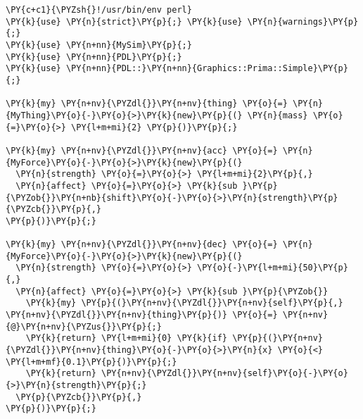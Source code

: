 \begin{Verbatim}[commandchars=\\\{\}]
\PY{c+c1}{\PYZsh{}!/usr/bin/env perl}
\PY{k}{use} \PY{n}{strict}\PY{p}{;} \PY{k}{use} \PY{n}{warnings}\PY{p}{;}
\PY{k}{use} \PY{n+nn}{MySim}\PY{p}{;}
\PY{k}{use} \PY{n+nn}{PDL}\PY{p}{;}
\PY{k}{use} \PY{n+nn}{PDL::}\PY{n+nn}{Graphics::Prima::Simple}\PY{p}{;}

\PY{k}{my} \PY{n+nv}{\PYZdl{}}\PY{n+nv}{thing} \PY{o}{=} \PY{n}{MyThing}\PY{o}{-}\PY{o}{>}\PY{k}{new}\PY{p}{(} \PY{n}{mass} \PY{o}{=}\PY{o}{>} \PY{l+m+mi}{2} \PY{p}{)}\PY{p}{;}

\PY{k}{my} \PY{n+nv}{\PYZdl{}}\PY{n+nv}{acc} \PY{o}{=} \PY{n}{MyForce}\PY{o}{-}\PY{o}{>}\PY{k}{new}\PY{p}{(}
  \PY{n}{strength} \PY{o}{=}\PY{o}{>} \PY{l+m+mi}{2}\PY{p}{,}
  \PY{n}{affect} \PY{o}{=}\PY{o}{>} \PY{k}{sub }\PY{p}{\PYZob{}}\PY{n+nb}{shift}\PY{o}{-}\PY{o}{>}\PY{n}{strength}\PY{p}{\PYZcb{}}\PY{p}{,}
\PY{p}{)}\PY{p}{;}

\PY{k}{my} \PY{n+nv}{\PYZdl{}}\PY{n+nv}{dec} \PY{o}{=} \PY{n}{MyForce}\PY{o}{-}\PY{o}{>}\PY{k}{new}\PY{p}{(}
  \PY{n}{strength} \PY{o}{=}\PY{o}{>} \PY{o}{-}\PY{l+m+mi}{50}\PY{p}{,}
  \PY{n}{affect} \PY{o}{=}\PY{o}{>} \PY{k}{sub }\PY{p}{\PYZob{}}
    \PY{k}{my} \PY{p}{(}\PY{n+nv}{\PYZdl{}}\PY{n+nv}{self}\PY{p}{,} \PY{n+nv}{\PYZdl{}}\PY{n+nv}{thing}\PY{p}{)} \PY{o}{=} \PY{n+nv}{@}\PY{n+nv}{\PYZus{}}\PY{p}{;}
    \PY{k}{return} \PY{l+m+mi}{0} \PY{k}{if} \PY{p}{(}\PY{n+nv}{\PYZdl{}}\PY{n+nv}{thing}\PY{o}{-}\PY{o}{>}\PY{n}{x} \PY{o}{<} \PY{l+m+mf}{0.1}\PY{p}{)}\PY{p}{;}
    \PY{k}{return} \PY{n+nv}{\PYZdl{}}\PY{n+nv}{self}\PY{o}{-}\PY{o}{>}\PY{n}{strength}\PY{p}{;}
  \PY{p}{\PYZcb{}}\PY{p}{,}
\PY{p}{)}\PY{p}{;}
\end{Verbatim}
